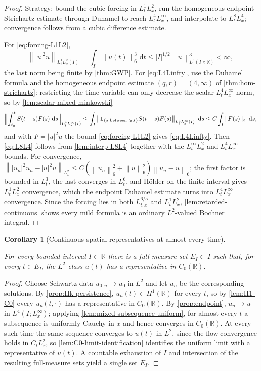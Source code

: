 \documentclass[11pt,oneside]{book}
\providecommand{\uses}[1]{}
\newtheorem{corollary}[theorem]{Corollary}
\theoremstyle{definition}
\theoremstyle{remark}
\newcommand{\R}{\mathbb R}
\newcommand{\1}{\mathbf 1}
\newcommand{\dd}{\,\mathrm d}
\newcommand{\norm}[1]{\left\lVert #1\right\rVert}
\begin{document}
\begin{proof}
\uses{thm:hom-strichartz, thm:GWP, lem:scalar-mixed-minkowski, lem:interp-L8L4, lem:retarded-continuous}
Strategy: bound the cubic forcing in $L^1_tL^2_x$, run the homogeneous
endpoint Strichartz estimate through Duhamel to reach $L^4_tL^\infty_x$, and
interpolate to $L^8_tL^4_x$; convergence follows from a cubic difference
estimate.

For \eqref{eq:forcing-L1L2},
\[
 \norm{|u|^2u}_{L^1_tL^2_x(I)}=\int_I\norm{u(t)}_6^3\,\dd t
 \le|I|^{1/2}\norm u_{L^6(I\times\R)}^3<\infty,
\]
the last norm being finite by \cref{thm:GWP}.  For \eqref{eq:L4Linfty}, use the
Duhamel formula and the homogeneous endpoint estimate $(q,r)=(4,\infty)$ of
\cref{thm:hom-strichartz}: restricting the time variable can only decrease the
scalar $L^4_tL^\infty_x$ norm, so by \cref{lem:scalar-mixed-minkowski}
\[
 \Bigl\|\int_{t_0}^tS(t-s)F(s)\,\dd s\Bigr\|_{L^4_tL^\infty_x(I)}
 \le\int_I\norm{\1_{\{s\text{ between }t_0,t\}}S(t-s)F(s)}_{L^4_tL^\infty_x(I)}\,\dd s
 \le C\int_I\norm{F(s)}_2\,\dd s,
\]
and with $F=|u|^2u$ the bound \eqref{eq:forcing-L1L2} gives
\eqref{eq:L4Linfty}.  Then \eqref{eq:L8L4} follows from \cref{lem:interp-L8L4}
together with the $L^\infty_tL^2_x$ and $L^4_tL^\infty_x$ bounds.  For
convergence, $\norm{|u_n|^2u_n-|u|^2u}_{L^2_x}
\le C(\norm{u_n}_6^2+\norm u_6^2)\norm{u_n-u}_6$; the first factor is bounded in
$L^3_t$, the last converges in $L^6_t$, and Hölder on the finite interval gives
$L^1_tL^2_x$ convergence, which the endpoint Duhamel estimate turns into
$L^4_tL^\infty_x$ convergence.  Since the forcing lies in both $L^{6/5}_{t,x}$
and $L^1_tL^2_x$, \cref{lem:retarded-continuous} shows every mild formula is an
ordinary $L^2$-valued Bochner integral.
\end{proof}

\begin{corollary}[Continuous spatial representatives at almost every time]
\label{cor:C0-slices}
\uses{prop:endpoint, lem:H1-C0, lem:C0-limit-identification}
For every bounded interval $I\subset\R$ there is a full-measure set
$E_I\subset I$ such that, for every $t\in E_I$, the $L^2$ class $u(t)$ has a
representative in $C_0(\R)$.
\end{corollary}

\begin{proof}
\uses{prop:Hk-persistence, prop:endpoint, lem:mixed-subsequence-uniform, lem:H1-C0, lem:C0-limit-identification}
Choose Schwartz data $u_{0,n}\to u_0$ in $L^2$ and let $u_n$ be the
corresponding solutions.  By \cref{prop:Hk-persistence}, $u_n(t)\in H^1(\R)$
for every $t$, so by \cref{lem:H1-C0} every $u_n(t,\cdot)$ has a representative
in $C_0(\R)$.  By \cref{prop:endpoint}, $u_n\to u$ in $L^4(I;L^\infty_x)$;
applying \cref{lem:mixed-subsequence-uniform}, for almost every $t$ a
subsequence is uniformly Cauchy in $x$ and hence converges in $C_0(\R)$.  At
every such time the same sequence converges to $u(t)$ in $L^2$, since the flow
convergence holds in $C_tL^2_x$, so \cref{lem:C0-limit-identification}
identifies the uniform limit with a representative of $u(t)$.  A countable
exhaustion of $I$ and intersection of the resulting full-measure sets yield a
single set $E_I$.
\end{proof}
\end{document}
